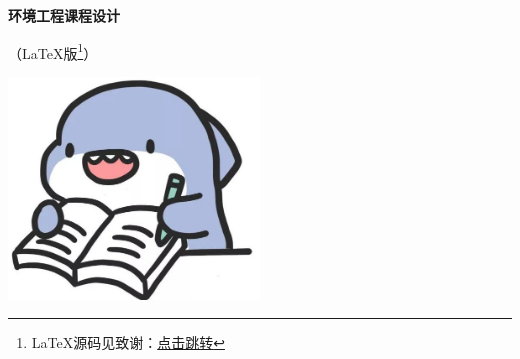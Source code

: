 \setcounter{page}{1}

\null\vskip 0.5cm
\begin{center}
\textbf{环境工程课程设计}

（\LaTeX 版\footnote{\LaTeX 源码见致谢：\hyperlink{mythankslink}{点击跳转}
}）
\end{center}

\vskip 2cm
\begin{center}
\par
{}\par
{}\par
\makebox[3em]{}\par
{}\par

\vfill
\includegraphics[width=0.5\textwidth]{school_badge/nostudy1.jpg}
\end{center}

\normalsize
\newpage
\tableofcontents
\listoffigures        %
\listoftables         %
\newpage


\setcounter{page}{1}
